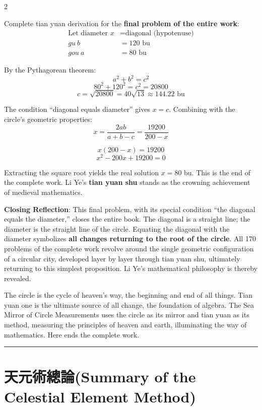\documentclass[11pt,a4paper]{article}
\newcommand{\shortline}{\noindent\rule{0.5\textwidth}{0.4pt}\par}
\newcommand{\bilingualsection}[2]{\section*{#1\quad(#2)}}
\begin{document}
\begin{paracol}{2}
{Complete tian yuan derivation for the \textbf{final problem of the entire work}:
\begin{align*}
\text{Let diameter } x &= \text{diagonal (hypotenuse)} \\
gu \ b &= 120 \text{ bu} \\
gou \ a &= 80 \text{ bu}
\end{align*}

By the Pythagorean theorem:
$$a^2 + b^2 = c^2$$
$$80^2 + 120^2 = c^2 = 20800$$
$$c = \sqrt{20800} = 40\sqrt{13} \approx 144.22 \text{ bu}$$

The condition ``diagonal equals diameter'' gives $x = c$. Combining with the circle's geometric properties:
$$x = \frac{2ab}{a + b - c} = \frac{19200}{200 - x}$$

$$x(200 - x) = 19200$$
$$x^2 - 200x + 19200 = 0$$

Extracting the square root yields the real solution $x = 80$ bu. This is the end of the complete work. Li Ye's \textbf{tian yuan shu} stands as the crowning achievement of medieval mathematics.

\textbf{Closing Reflection}: This final problem, with its special condition ``the diagonal equals the diameter,'' closes the entire book. The diagonal is a straight line; the diameter is the straight line of the circle. Equating the diagonal with the diameter symbolizes \textbf{all changes returning to the root of the circle}. All 170 problems of the complete work revolve around the single geometric configuration of a circular city, developed layer by layer through tian yuan shu, ultimately returning to this simplest proposition. Li Ye's mathematical philosophy is thereby revealed.

The circle is the cycle of heaven's way, the beginning and end of all things. Tian yuan one is the ultimate source of all change, the foundation of algebra. The Sea Mirror of Circle Measurements uses the circle as its mirror and tian yuan as its method, measuring the principles of heaven and earth, illuminating the way of mathematics. Here ends the complete work.}
\end{paracol}

\vspace{0.4cm}
\begin{center}
\shortline
\end{center}
\vspace{0.3cm}

\newpage
\bilingualsection{天元術總論}{Summary of the Celestial Element Method}
\end{document}
